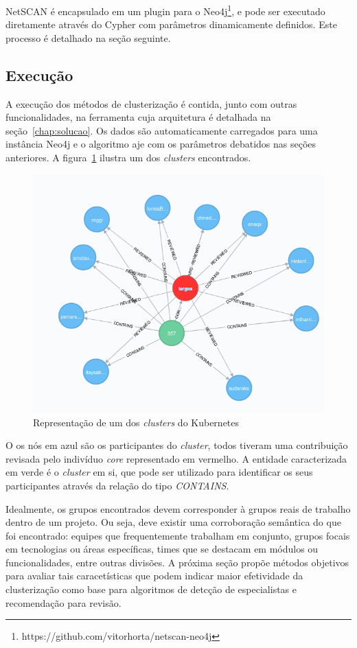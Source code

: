 \documentclass[12pt,openany,oneside,a4paper,english,brazil]{abntbibufjf}
\begin{document}
  NetSCAN é encapsulado em um plugin para o Neo4j\footnote{https://github.com/vitorhorta/netscan-neo4j}, e pode ser executado diretamente através do Cypher com parâmetros dinamicamente definidos. Este processo é detalhado na seção seguinte.

  \subsection{Execução}

  A execução dos métodos de clusterização é contida, junto com outras funcionalidades, na ferramenta cuja arquitetura é detalhada na seção~\ref{chap:solucao}. Os dados são automaticamente carregados para uma instância Neo4j e o algoritmo aje com os parâmetros debatidos nas seções anteriores. A figura~\ref{fig:cluster} ilustra um dos \textit{clusters} encontrados.

  \begin{figure}[tbp]
  \centerline{\includegraphics[width=\linewidth]{cluster}}
  \caption{Representação de um dos \textit{clusters} do Kubernetes}
  \label{fig:cluster}
  \end{figure}

  O os nós em azul são os participantes do \textit{cluster}, todos tiveram uma contribuição revisada pelo indivíduo \textit{core} representado em vermelho. A entidade caracterizada em verde é o \textit{cluster} em si, que pode ser utilizado para identificar os seus participantes através da relação do tipo \textit{CONTAINS}.

  Idealmente, os grupos encontrados devem corresponder à grupos reais de trabalho dentro de um projeto. Ou seja, deve existir uma corroboração semântica do que foi encontrado: equipes que frequentemente trabalham em conjunto, grupos focais em tecnologias ou áreas específicas, times que se destacam em módulos ou funcionalidades, entre outras divisões. A próxima seção propõe métodos objetivos para avaliar tais caracetísticas que podem indicar maior efetividade da clusterização como base para algoritmos de detcção de especialistas e recomendação para revisão.
\end{document}
